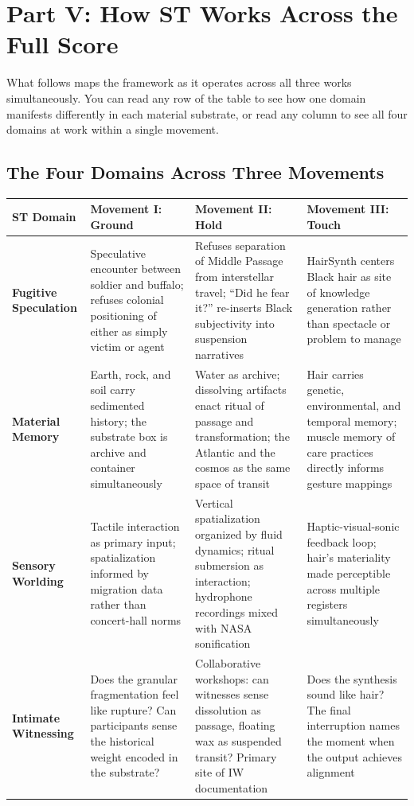 \section*{Part V: How ST Works Across the Full Score}

What follows maps the framework as it operates across all three works simultaneously. You can read any row of the table to see how one domain manifests differently in each material substrate, or read any column to see all four domains at work within a single movement.

\subsection*{The Four Domains Across Three Movements}

\begin{center}
\small
\begin{tabular}{|p{2.8cm}|p{3.5cm}|p{3.5cm}|p{3.5cm}|}
\hline
\textbf{ST Domain} & \textbf{Movement I: Ground} & \textbf{Movement II: Hold} & \textbf{Movement III: Touch} \\
\hline
\textbf{Fugitive Speculation} &
Speculative encounter between soldier and buffalo; refuses colonial positioning of either as simply victim or agent &
Refuses separation of Middle Passage from interstellar travel; ``Did he fear it?'' re-inserts Black subjectivity into suspension narratives &
HairSynth centers Black hair as site of knowledge generation rather than spectacle or problem to manage \\
\hline
\textbf{Material Memory} &
Earth, rock, and soil carry sedimented history; the substrate box is archive and container simultaneously &
Water as archive; dissolving artifacts enact ritual of passage and transformation; the Atlantic and the cosmos as the same space of transit &
Hair carries genetic, environmental, and temporal memory; muscle memory of care practices directly informs gesture mappings \\
\hline
\textbf{Sensory Worlding} &
Tactile interaction as primary input; spatialization informed by migration data rather than concert-hall norms &
Vertical spatialization organized by fluid dynamics; ritual submersion as interaction; hydrophone recordings mixed with NASA sonification &
Haptic-visual-sonic feedback loop; hair's materiality made perceptible across multiple registers simultaneously \\
\hline
\textbf{Intimate Witnessing} &
Does the granular fragmentation feel like rupture? Can participants sense the historical weight encoded in the substrate? &
Collaborative workshops: can witnesses sense dissolution as passage, floating wax as suspended transit? Primary site of IW documentation &
Does the synthesis sound like hair? The final interruption names the moment when the output achieves alignment \\
\hline
\end{tabular}
\end{center}

